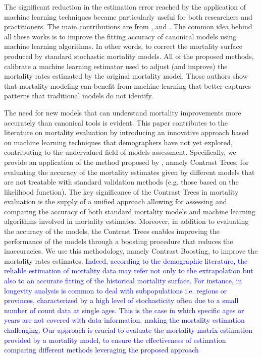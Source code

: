 \documentclass[fleqn,10pt]{wlscirep}
\begin{document}
The significant reduction in the estimation error reached by the application of machine learning techniques became particularly useful for both researchers and practitioners. The main contributions are from \cite{Deprez}, \cite{LevPiz} and \cite{LevNi}. The common idea behind all these works is to improve the fitting accuracy of canonical models using machine learning algorithms. In other words, to correct the mortality surface produced by standard stochastic mortality models. All of the proposed methods, calibrate a machine learning estimator used to adjust (and improve) the mortality rates estimated by the original mortality model. Those authors show that mortality modeling can benefit from machine learning that better captures patterns that traditional models do not identify. 

The need for new models that can understand mortality improvements more accurately than canonical tools is evident. 
This paper contributes to the literature on mortality evaluation by introducing an innovative approach based on machine learning techniques that demographers have not yet explored, contributing to the undervalued field of models assessment. 
Specifically, we provide an application of the method proposed by \cite{Friedman2020}, namely Contrast Trees, for evaluating the accuracy of the mortality estimates given by different models that are not treatable with standard validation methods (e.g. those based on the likelihood function). 
The key significance of the Contrast Trees in mortality evaluation is the supply of a unified approach allowing for assessing and comparing the accuracy of both standard mortality models and machine learning algorithms involved in mortality estimates. Moreover, in addition to evaluating the accuracy of the models, the Contrast Trees enables improving the performance of the models through a boosting procedure that reduces the inaccuracies. We use this methodology, namely Contrast Boosting, to improve the mortality rates estimates. \textcolor{blue}{Indeed, according to the demographic literature, the reliable estimation of mortality data may refer not only to the extrapolation but also to an accurate fitting of the historical mortality surface.  
For instance, in longevity analysis is common to deal with subpopulations i.e. regions or provinces, characterized by a high level of stochasticity often due to a small number of count data at single ages. This is the case in which specific ages or years are not covered with data information, making the mortality estimation challenging. Our approach is crucial to evaluate the mortality matrix estimation provided by a mortality model, to ensure the effectiveness of estimation comparing  different methods leveraging the proposed approach}
\end{document}
